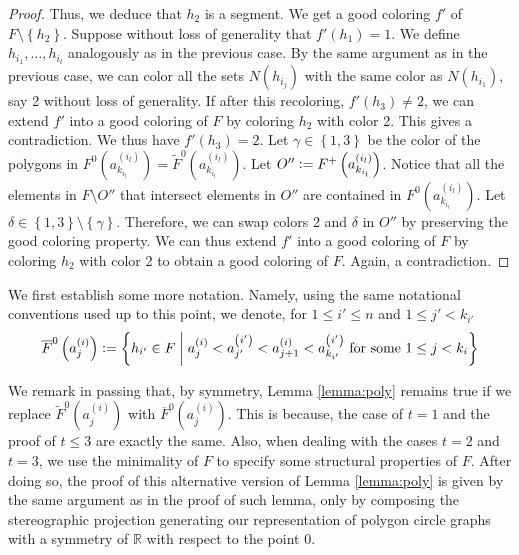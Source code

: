 \documentclass[12pt]{article}
\theoremstyle{definition}
\newcommand{\defeq}{\vcentcolon=}
\begin{document}
\begin{proof}
         Thus, we deduce that $h_2$ is a segment.
         We get a good coloring $f'$ of
         $F \setminus \left\{h_2\right\}$.
         Suppose without loss of generality
         that $f'\left(h_1\right) = 1$.
         We define $h_{i_1}, \ldots, h_{i_{l}}$ 
         analogously as in the previous case.
         By the same argument as in the previous case,
         we can color all the sets 
         $N\left(h_{i_{j}}\right)$ with the
         same color as $N\left(h_{i_1}\right)$,
         say 2 without loss of generality.
         If after this recoloring,
         $f'\left(h_3\right) \neq 2$, 
         we can extend $f'$ into a
         good coloring of $F$ by 
         coloring $h_2$ with color 2.
         This gives a contradiction.
         We thus have $f'\left(h_3\right) = 2$.
         Let $\gamma \in \left\{1, 3\right\}$
         be the color of the polygons
         in $F^{0}\left(a_{k_{i_{l}}}^{\left(i_{l}\right)}\right)
         = \widetilde{F}^{0}\left(
         a_{k_{i_{l}}}^{\left(i_{l}\right)}\right)$.
         Let $O'' \defeq F^{+}\left(
         a_{k_{i_{l}}}^{\left(i_{l}\right)}\right)$.
         Notice that all the elements
         in $F \setminus O''$ 
         that intersect elements in $O''$
         are contained in $F^{0}\left(
         a_{k_{i_{l}}}^{\left(i_{l}\right)}\right)$.
         Let $\delta \in \left\{1, 3\right\}
         \setminus \left\{\gamma\right\}$.
         Therefore, we can swap colors
         2 and $\delta$ in $O''$
         by preserving the good coloring property.
         We can thus extend $f'$ into a
         good coloring of $F$ by
         coloring $h_2$ with color 2
         to obtain a good coloring of $F$.
         Again, a contradiction.
     \end{proof}

     We first establish some more notation.
     Namely, using the same notational conventions
     used up to this point, we denote, for
     $1 \leq i' \leq n$ and $1 \leq j' < k_{i'}$
     \begin{gather*}
         \overline{F}^{0}\left(a_{j}^{\left(i\right)}\right) \defeq
         \left\{h_{i'} \in F \;\middle|\;
         a_{j}^{\left(i\right)} <
         a_{j'}^{\left(i'\right)} <
         a_{j+1}^{\left(i\right)} <
         a_{k_{i'}}^{\left(i'\right)}
         \text{ for some }
         1 \leq j < k_{i}\right\}
     \end{gather*}
     
     We remark in passing that, by symmetry,
     Lemma \ref{lemma:poly} remains 
     true if we
     replace $\widetilde{F}^{0}\left(a_{j}^{\left(i\right)}\right)$ 
     with $\overline{F}^{0}\left(a_{j}^{\left(i\right)}\right)$.
     This is because, the case of $t = 1$
     and the proof of $t \leq 3$ are exactly
     the same. Also, when 
     dealing with the cases $t = 2$ 
     and $t = 3$, we use the minimality
     of $F$ to specify some structural
     properties of $F$. After doing so,
     the proof of this alternative version of
     Lemma \ref{lemma:poly} is given by 
     the same argument as in the proof
     of such lemma, only by composing
     the stereographic projection
     generating our representation
     of polygon circle graphs with
     a symmetry of $\mathbb{R}$ with
     respect to the point 0.
\end{document}
